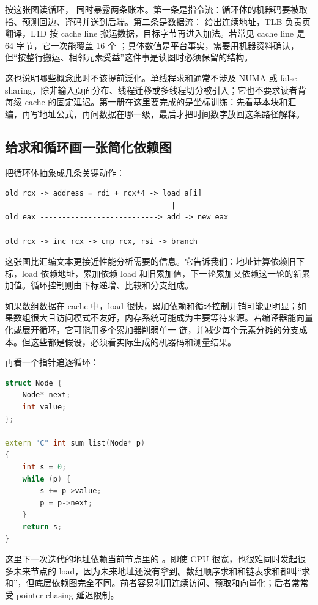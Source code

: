 按这张图读循环， 同时暴露两条账本。第一条是指令流：循环体的机器码要被取指、预测回边、译码并送到后端。第二条是数据流： 给出连续地址，TLB 负责页翻译，L1D 按 cache line 搬运数据，目标字节再进入加法。若常见 cache line 是 64 字节，它一次能覆盖 16 个 ；具体数值是平台事实，需要用机器资料确认，但“按整行搬运、相邻元素受益”这件事是读图时必须保留的结构。

这也说明哪些概念此时不该提前泛化。单线程求和通常不涉及 NUMA 或 false sharing，除非输入页面分布、线程迁移或多线程切分被引入；它也不要求读者背每级 cache 的固定延迟。第一册在这里要完成的是坐标训练：先看基本块和汇编，再写地址公式，再问数据在哪一级，最后才把时间数字放回这条路径解释。

\subsection{给求和循环画一张简化依赖图}

把循环体抽象成几条关键动作：

\begin{lstlisting}
old rcx -> address = rdi + rcx*4 -> load a[i]
                                      |
old eax ---------------------------> add -> new eax

old rcx -> inc rcx -> cmp rcx, rsi -> branch
\end{lstlisting}

这张图比汇编文本更接近性能分析需要的信息。它告诉我们：地址计算依赖旧下标，load 依赖地址，累加依赖 load 和旧累加值，下一轮累加又依赖这一轮的新累加值。循环控制则由下标递增、比较和分支组成。

如果数组数据在 cache 中，load 很快，累加依赖和循环控制开销可能更明显；如果数组很大且访问模式不友好，内存系统可能成为主要等待来源。若编译器能向量化或展开循环，它可能用多个累加器削弱单一  链，并减少每个元素分摊的分支成本。但这些都是假设，必须看实际生成的机器码和测量结果。

再看一个指针追逐循环：

\begin{lstlisting}[language=C++]
struct Node {
    Node* next;
    int value;
};

extern "C" int sum_list(Node* p)
{
    int s = 0;
    while (p) {
        s += p->value;
        p = p->next;
    }
    return s;
}
\end{lstlisting}

这里下一次迭代的地址依赖当前节点里的 。即使 CPU 很宽，也很难同时发起很多未来节点的 load，因为未来地址还没有拿到。数组顺序求和和链表求和都叫“求和”，但底层依赖图完全不同。前者容易利用连续访问、预取和向量化；后者常常受 pointer chasing 延迟限制。


